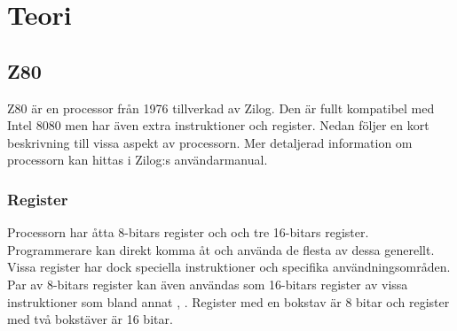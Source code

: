 \documentclass[main.tex]{subfiles}
\begin{document}
\section{Teori}
\subsection{Z80}
Z80 är en processor från 1976 tillverkad av Zilog. Den är fullt kompatibel med
Intel 8080 men har även extra instruktioner och register. Nedan följer en kort
beskrivning till vissa aspekt av processorn. Mer detaljerad information om
processorn kan hittas i Zilog:s användarmanual.
\cite{z80um}

\subsubsection{Register}
    Processorn har åtta 8-bitars register och och tre 16-bitars register.
    Programmerare kan direkt komma åt och använda de flesta av dessa generellt.
    Vissa register har dock speciella instruktioner och specifika
    användningsområden. Par av 8-bitars register kan även användas som
    16-bitars register av vissa instruktioner som bland annat ,
    . Register med en bokstav är 8 bitar och register med två
    bokstäver är 16 bitar.
\end{document}
